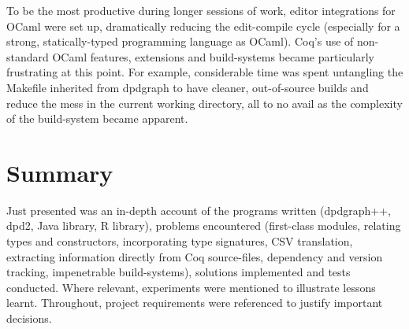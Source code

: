 To be the most productive during longer sessions of work, editor integrations
for OCaml were set up, dramatically reducing the edit-compile cycle (especially
for a strong, statically-typed programming language as OCaml). Coq's use of
non-standard OCaml features, extensions and build-systems became particularly
frustrating at this point. For example, considerable time was spent untangling
the Makefile inherited from dpdgraph to have cleaner, out-of-source builds and
reduce the mess in the current working directory, all to no avail as the
complexity of the build-system became apparent.

\section{Summary}

Just presented was an in-depth account of the programs written (dpdgraph++,
dpd2, Java library, R library), problems encountered (first-class modules,
relating types and constructors, incorporating type signatures, CSV
translation, extracting information directly from Coq source-files, dependency
and version tracking, impenetrable build-systems), solutions implemented and
tests conducted. Where relevant, experiments were mentioned to illustrate
lessons learnt. Throughout, project requirements were referenced to justify
important decisions.
